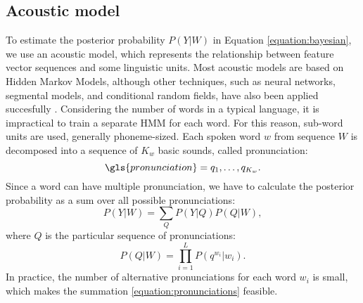 \subsection{Acoustic model}
\label{subsection:acoustic}
To estimate the posterior probability $P(Y|W)$ in Equation \ref{equation:bayesian}, we use an acoustic model, which represents the relationship between feature vector sequences and some linguistic units. Most acoustic models are based on Hidden Markov Models, although other techniques, such as neural networks, segmental models, and conditional random fields, have also been applied succesfully \cite{yu2009hidden, yu2008maximum, mohamed2012acoustic}. Considering the number of words in a typical language, it is impractical to train a separate HMM for each word. For this reason, sub-word units are used, generally phoneme-sized. Each spoken word $w$ from sequence $W$ is decomposed into a sequence of $K_{w}$ basic sounds, called pronunciation:
\begin{equation}
  \gls{pronunciation}=q_{1}, \ldots, q_{K_{w}}.
\end{equation}
Since a word can have multiple pronunciation, we have to calculate the posterior probability as a sum over all possible pronunciations:
\begin{equation}
  \label{equation:pronunciations}
  P(Y|W) = \sum_{Q}P(Y|Q)P(Q|W),
\end{equation}
where $Q$ is the particular sequence of pronunciations:
\begin{equation}
  P(Q|W)=\prod_{i=1}^{L}P(q^{w_{i}}|w_{i}).
\end{equation}
In practice, the number of alternative pronunciations for each word $w_{i}$ is small, which makes the summation \ref{equation:pronunciations} feasible.



